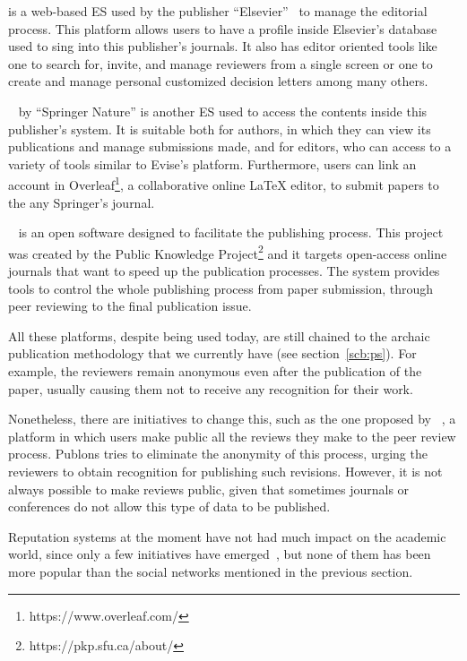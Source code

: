  is a web-based ES used by the publisher ``Elsevier''~\cite{evise} to
manage the editorial process. This platform allows users to have a profile
inside Elsevier's database used to sing into this publisher's journals. It also
has editor oriented tools like one to search for, invite, and manage reviewers
from a single screen or one to create and manage personal customized decision
letters among many others.

~\cite{myspringer} by ``Springer Nature'' is another ES used to
access the contents inside this publisher's system. It is suitable both for
authors, in which they can view its publications and manage submissions made,
and for editors, who can access to a variety of tools similar to Evise's
platform. Furthermore, users can link an account in
Overleaf\footnote{https://www.overleaf.com/}, a collaborative online \LaTeX
editor, to submit papers to the any Springer's journal.

~\cite{willinsky2005open} is an open software designed
to facilitate the publishing process. This project was created by the Public
Knowledge Project\footnote{https://pkp.sfu.ca/about/} and it targets open-access
online journals that want to speed up the publication processes. The system
provides tools to control the whole publishing process from paper submission,
through peer reviewing to the final publication issue.

All these platforms, despite being used today, are still chained to the archaic
publication methodology that we currently have (see section~\ref{scb:ps}). For
example, the reviewers remain anonymous even after the publication of the paper,
usually causing them not to receive any recognition for their work.

Nonetheless, there are initiatives to change this, such as the one proposed by
~\cite{rajpert2016rewarding}, a platform in which users make public
all the reviews they make to the peer review process. Publons tries to eliminate
the anonymity of this process, urging the reviewers to obtain recognition for
publishing such revisions. However, it is not always possible to make reviews
public, given that sometimes journals or conferences do not allow this type of
data to be published.

Reputation systems at the moment have not had much impact on the academic world,
since only a few initiatives have emerged~\cite{sabaterpeer}, but none of them
has been more popular than the social networks mentioned in the previous
section.

